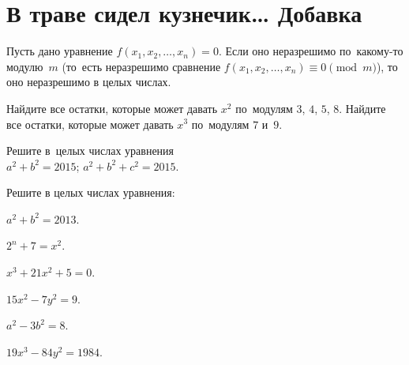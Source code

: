 
\section*{В траве сидел кузнечик{\ldots} Добавка}




\begin{problems}

Пусть дано уравнение $f(x_1, x_2, \ldots, x_n) = 0$.
Если оно неразрешимо по~какому-то модулю~$m$ (то~есть неразрешимо сравнение
$f(x_1, x_2, \dots, x_n) \equiv 0 \pmod m$), то оно неразрешимо в целых числах.

\item
Найдите все остатки, которые может давать $x^2$ по~модулям $3$, $4$, $5$, $8$.
Найдите все остатки, которые может давать $x^3$ по~модулям $7$ и~$9$.

\item
Решите в~целых числах уравнения
\\
\sp $a^2 + b^2 = 2015$;
\qquad
\sp $a^2 + b^2 + c^2 = 2015$.

\end{problems}

Решите в целых числах уравнения:
\vspace{-\parskip}
\begin{multicols}{2}
\begin{problems}

\item $a^2 + b^2 = 2013$.

\item $2^n + 7 = x^2$.

\item $x^3 + 21 x^2 + 5 = 0$.

\item $15x^2 - 7y^2 = 9$.

\item $a^2 - 3b^2 = 8$.

\item $19x^3 - 84y^2 = 1984$.

\end{problems}
\end{multicols}


